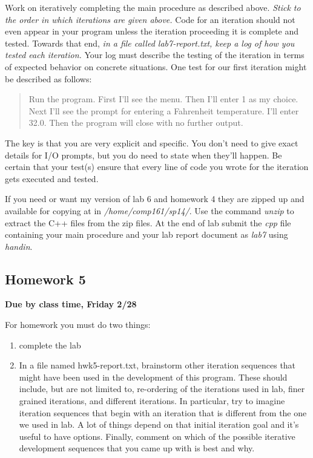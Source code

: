 \documentclass[]{tufte-handout}
\begin{document}
Work on iteratively completing the main procedure as described above. \textit{Stick to the order in which iterations are given above.}  Code for an iteration should not even appear in your program unless the iteration proceeding it is complete and tested. Towards that end, \textit{in a file called lab7-report.txt, keep a log of how you tested each iteration.} Your log must describe the testing of the iteration in terms of expected behavior on concrete situations. One test for our first iteration might be described as follows:
\begin{quote}
Run the program. First I'll see the menu. Then I'll enter 1 as my choice. Next I'll see the prompt for entering a Fahrenheit temperature. I'll enter 32.0.  Then the program will close with no further output. 
\end{quote}
The key is that you are very explicit and specific. You don't need to give exact details for I/O prompts, but you do need to state when they'll happen. Be certain that your test(s) ensure that every line of code you wrote for the iteration gets executed and tested.

If you need or want my version of lab 6 and homework 4 they are zipped up and available for copying at in \textit{/home/comp161/sp14/}.  Use the command \textit{unzip} to extract the C++ files from the zip files.  At the end of lab submit the \textit{cpp} file containing your main procedure and your lab report document as \textit{lab7} using \textit{handin}. 


\subsection{Homework 5}
\begin{center}
\textbf{Due by class time, Friday 2/28}
\end{center}

For homework you must do two things:
\begin{enumerate}
\item complete the lab
\item In a file named hwk5-report.txt, brainstorm other iteration sequences that might have been used in the development of this program. These should include, but are not limited to, re-ordering of the iterations used in lab, finer grained iterations, and different iterations. In particular, try to imagine iteration sequences that begin with an iteration that is different from the one we used in lab. A lot of things depend on that initial iteration goal and it's useful to have options. Finally, comment on which of the possible iterative development sequences that you came up with is best and why.
\end{enumerate}
\end{document}

